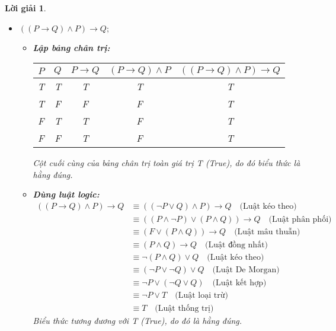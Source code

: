 \documentclass[11pt, oneside, a4paper]{article}
\newtheorem{loigiai}{Lời giải}[bt]
\begin{document}
    \begin{loigiai}
    \begin{itemize}
      \item[a)] $((P \rightarrow Q) \land P) \rightarrow Q;$
        \begin{itemize}
            \item \textbf{Lập bảng chân trị:}
            \begin{center}
            \begin{tabular}{|c|c|c|c|c|}
            \hline
            $P$ & $Q$ & $P \rightarrow Q$ & $(P \rightarrow Q) \land P$ & $((P \rightarrow Q) \land P) \rightarrow Q$ \\
            \hline
            T & T & T & T & T \\
            T & F & F & F & T \\
            F & T & T & F & T \\
            F & F & T & F & T \\
            \hline
            \end{tabular}
            \end{center}
            Cột cuối cùng của bảng chân trị toàn giá trị T (True), do đó biểu thức là hằng đúng.
            \item \textbf{Dùng luật logic:}
            \begin{align*} ((P \rightarrow Q) \land P) \rightarrow Q &\equiv ((\lnot P \lor Q) \land P) \rightarrow Q \quad \text{(Luật kéo theo)} \\ &\equiv ( (P \land \lnot P) \lor (P \land Q) ) \rightarrow Q \quad \text{(Luật phân phối)} \\ &\equiv (F \lor (P \land Q) ) \rightarrow Q \quad \text{(Luật mâu thuẫn)} \\ &\equiv (P \land Q) \rightarrow Q \quad \text{(Luật đồng nhất)} \\ &\equiv \lnot (P \land Q) \lor Q \quad \text{(Luật kéo theo)} \\ &\equiv (\lnot P \lor \lnot Q) \lor Q \quad \text{(Luật De Morgan)} \\ &\equiv \lnot P \lor (\lnot Q \lor Q) \quad \text{(Luật kết hợp)} \\ &\equiv \lnot P \lor T \quad \text{(Luật loại trừ)} \\ &\equiv T \quad \text{(Luật thống trị)}\end{align*}
            Biểu thức tương đương với T (True), do đó là hằng đúng.
        \end{itemize}
    

\end{itemize}
\end{loigiai}
\end{document}
